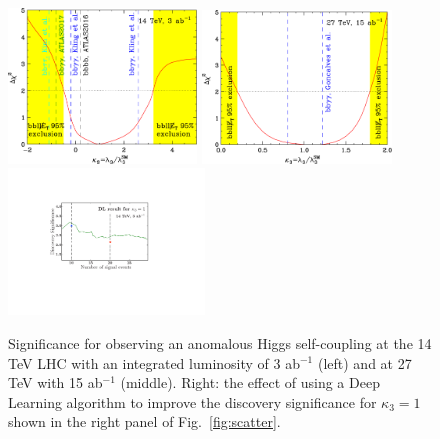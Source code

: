 %
\begin{figure}[t]
\centering
\includegraphics[width=5cm]{./section3/plots/precision_14.pdf}   \hspace*{0.cm}
\includegraphics[width=5.03cm]{./section3/plots/precision_27.pdf}   \hspace*{-0.cm}
\includegraphics[width=5.2cm,height=4.cm]{./section3/plots/dl.pdf}   
\caption{\label{fig:k3precision} 
Significance for observing an anomalous Higgs self-coupling at the 14 TeV LHC with an integrated luminosity of 3 ab$^{-1}$ (left) and at 27 TeV with 15 ab$^{-1}$ (middle).
Right: the effect of using a Deep Learning algorithm to improve the discovery significance for $\kappa_3=1$ shown in 
the right panel of Fig.~\ref{fig:scatter}.
}
\end{figure}
%

